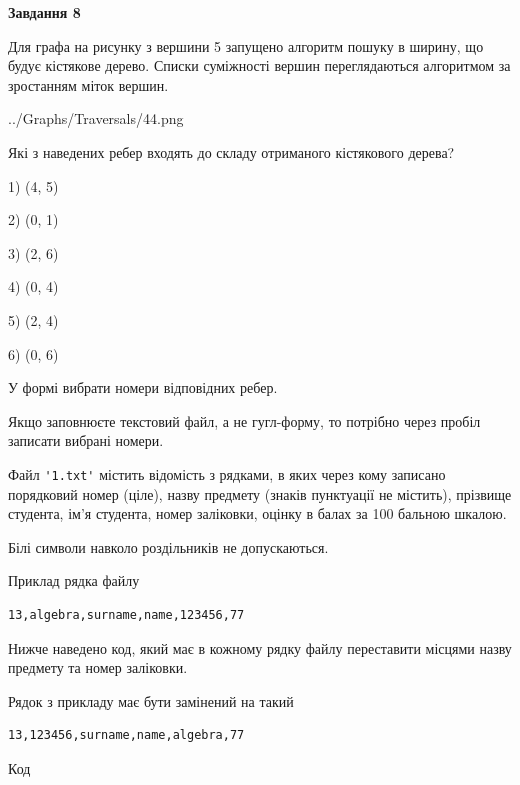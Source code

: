 \documentclass[12pt, ukrainian]{article}
\def\code#1{\Verb!#1!}
\begin{document}
{\begin {large}
{\begin {center}\textbf{Завдання 8}\end {center}}\par
Для графа на рисунку з вершини 5 запущено алгоритм пошуку в ширину, що будує кістякове дерево. Списки суміжності вершин переглядаються алгоритмом за зростанням міток вершин.\par
\begin{center}
	{../Graphs/Traversals/44.png}
\end{center}
\par Які з наведених ребер входять до складу отриманого кістякового дерева?\par
1) (4, 5)\par
2) (0, 1)\par
3) (2, 6)\par
4) (0, 4)\par
5) (2, 4)\par
6) (0, 6)\par
{\vskip 15pt} У формі вибрати номери відповідних ребер.


Якщо заповнюєте текстовий файл, а не гугл-форму, то потрібно через пробіл записа\-ти вибрані номери.\par
\newpage


Файл \code{'1.txt'} містить відомість з рядками, в яких через кому записано поряд\-ковий номер (ціле), назву предмету (знаків пунктуації не містить), прізвище студента, ім'я студента, номер заліковки, оцінку в балах за 100 бальною шкалою.

Білі символи навколо роздільників не допускаються.

Приклад рядка файлу



\begin{verbatim}
13,algebra,surname,name,123456,77
\end{verbatim}


Нижче наведено код, який має в кожному рядку файлу переставити місцями назву предмету та номер заліковки.

Рядок з прикладу має бути замінений на такий



\begin{verbatim}
13,123456,surname,name,algebra,77
\end{verbatim}




Код




\end{large}}
\end{document}
